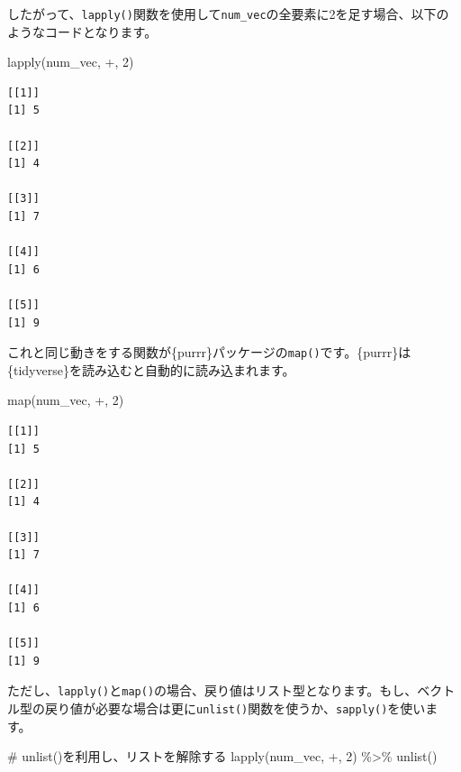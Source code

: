 \documentclass[
  a4paper,
  pandoc,
  ja=standard,
  jafont=haranoaji]{bxjsbook}
\newenvironment{Shaded}{\begin{snugshade}}{\end{snugshade}}
\newcommand{\AttributeTok}[1]{\textcolor[rgb]{0.00,0.48,0.65}{#1}}
\newcommand{\CommentTok}[1]{\textcolor[rgb]{0.37,0.37,0.37}{#1}}
\newcommand{\DecValTok}[1]{\textcolor[rgb]{0.68,0.00,0.00}{#1}}
\newcommand{\FunctionTok}[1]{\textcolor[rgb]{0.28,0.35,0.67}{#1}}
\newcommand{\NormalTok}[1]{\textcolor[rgb]{0.00,0.48,0.65}{#1}}
\newcommand{\SpecialCharTok}[1]{\textcolor[rgb]{0.37,0.37,0.37}{#1}}
\newcommand{\StringTok}[1]{\textcolor[rgb]{0.13,0.47,0.30}{#1}}
\begin{document}
したがって、\texttt{lapply()}関数を使用して\texttt{num\_vec}の全要素に2を足す場合、以下のようなコードとなります。

\begin{Shaded}
\begin{Highlighting}[numbers=left,,]
\FunctionTok{lapply}\NormalTok{(num\_vec, }\StringTok{\textasciigrave{}}\AttributeTok{+}\StringTok{\textasciigrave{}}\NormalTok{, }\DecValTok{2}\NormalTok{)}
\end{Highlighting}
\end{Shaded}

\begin{verbatim}
[[1]]
[1] 5

[[2]]
[1] 4

[[3]]
[1] 7

[[4]]
[1] 6

[[5]]
[1] 9
\end{verbatim}

これと同じ動きをする関数が\{purrr\}パッケージの\texttt{map()}です。\{purrr\}は\{tidyverse\}を読み込むと自動的に読み込まれます。

\begin{Shaded}
\begin{Highlighting}[numbers=left,,]
\FunctionTok{map}\NormalTok{(num\_vec, }\StringTok{\textasciigrave{}}\AttributeTok{+}\StringTok{\textasciigrave{}}\NormalTok{, }\DecValTok{2}\NormalTok{)}
\end{Highlighting}
\end{Shaded}

\begin{verbatim}
[[1]]
[1] 5

[[2]]
[1] 4

[[3]]
[1] 7

[[4]]
[1] 6

[[5]]
[1] 9
\end{verbatim}

ただし、\texttt{lapply()}と\texttt{map()}の場合、戻り値はリスト型となります。もし、ベクトル型の戻り値が必要な場合は更に\texttt{unlist()}関数を使うか、\texttt{sapply()}を使います。

\begin{Shaded}
\begin{Highlighting}[numbers=left,,]
\CommentTok{\# unlist()を利用し、リストを解除する}
\FunctionTok{lapply}\NormalTok{(num\_vec, }\StringTok{\textasciigrave{}}\AttributeTok{+}\StringTok{\textasciigrave{}}\NormalTok{, }\DecValTok{2}\NormalTok{) }\SpecialCharTok{\%\textgreater{}\%} \FunctionTok{unlist}\NormalTok{()}
\end{Highlighting}
\end{Shaded}
\end{document}
